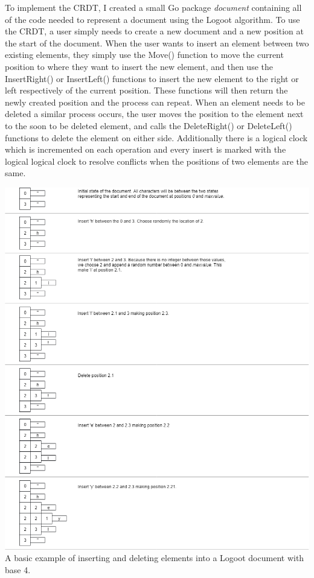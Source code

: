 \documentclass[11pt]{article}
\begin{document}
To implement the CRDT, I created a small Go package \textit{document} containing all of the code needed to represent a document using the Logoot algorithm. To use the CRDT, a user simply needs to create a new document and a new position at the start of the document. When the user wants to insert an element between two existing elements, they simply use the Move() function to move the current position to where they want to insert the new element, and then use the  InsertRight() or InsertLeft() functions to insert the new element to the right or left respectively of the current position. These functions will then return the newly created position and the process can repeat. When an element needs to be deleted a similar process occurs, the user moves the position to the element next to the soon to be deleted element, and calls the DeleteRight() or DeleteLeft() functions to delete the element on either side. Additionally there is a logical clock which is incremented on each operation and every insert is marked with the logical logical clock to resolve conflicts when the positions of two elements are the same.

\begin{center}
	\includegraphics[scale=0.5]{document.png}\\
	A basic example of inserting and deleting elements into a Logoot document with base 4.
\end{center}
\end{document}
